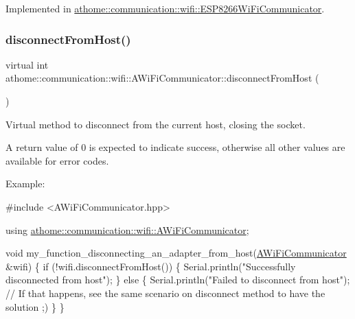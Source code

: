 Implemented in \mbox{\hyperlink{classathome_1_1communication_1_1wifi_1_1_e_s_p8266_wi_fi_communicator_a7e53e10b858aebc5e7c6c0ea6007f84a}{athome\+::communication\+::wifi\+::\+E\+S\+P8266\+Wi\+Fi\+Communicator}}.

\mbox{\label{classathome_1_1communication_1_1wifi_1_1_a_wi_fi_communicator_aebcf385c3e0382eda7c99760f100901c}} 
\subsubsection{\texorpdfstring{disconnect\+From\+Host()}{disconnectFromHost()}}
{\footnotesize\ttfamily virtual int athome\+::communication\+::wifi\+::\+A\+Wi\+Fi\+Communicator\+::disconnect\+From\+Host (\begin{DoxyParamCaption}{ }\end{DoxyParamCaption})\hspace{0.3cm}{\ttfamily [pure virtual]}}

Virtual method to disconnect from the current host, closing the socket.

A return value of 0 is expected to indicate success, otherwise all other values are available for error codes.

Example\+:


\begin{DoxyCode}
\textcolor{preprocessor}{#include <AWiFiCommunicator.hpp>}

\textcolor{keyword}{using} \mbox{\hyperlink{classathome_1_1communication_1_1wifi_1_1_a_wi_fi_communicator}{athome::communication::wifi::AWiFiCommunicator}};

\textcolor{keywordtype}{void} my\_function\_disconnecting\_an\_adapter\_from\_host(\mbox{\hyperlink{classathome_1_1communication_1_1wifi_1_1_a_wi_fi_communicator_a0098148fe8d0eeee99b7f8f72a72a900}{AWiFiCommunicator}} &wifi) \{
  \textcolor{keywordflow}{if} (!wifi.disconnectFromHost()) \{
    Serial.println(\textcolor{stringliteral}{"Successfully disconnected from host"});
  \} \textcolor{keywordflow}{else} \{
    Serial.println(\textcolor{stringliteral}{"Failed to disconnect from host"}); \textcolor{comment}{// If that happens, see the same scenario on
       disconnect method to have the solution ;)}
  \}
\}
\end{DoxyCode}
 

